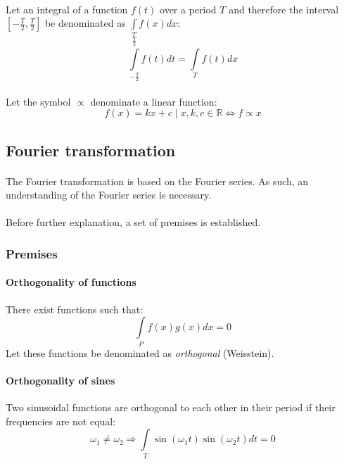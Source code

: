 \documentclass{article}
\begin{document}
\paragraph*{}
Let an integral of a function $f(t)$ over a period $T$ and therefore the
interval $[-\frac{T}{2}, \frac{T}{2}]$ be denominated as $\int\limits_{T} f(x) dx$:
$$\int\limits_{-\frac{T}{2}}^{\frac{T}{2}} f(t) dt = \int\limits_{T} f(t) dx$$

\paragraph*{}
Let the symbol $\propto$ denominate a linear function:
$$f(x) = k x + c \mid x, k, c \in \mathbb{R} \iff f \propto x$$

\subsection{Fourier transformation}

\paragraph*{}
The Fourier transformation is based on the Fourier series. As such, an
understanding of the Fourier series is necessary.

\paragraph*{}
Before further explanation, a set of premises is established.

\subsubsection{Premises}

\paragraph{Orthogonality of functions}
There exist functions such that:
$$\int\limits_P f(x) g(x) dx = 0$$
Let these functions be denominated as \textit{orthogonal} (Weisstein). 

\paragraph{Orthogonality of sines}
Two sinusoidal functions are orthogonal to each other in their period if their
frequencies are not equal:
$$\omega_1 \neq \omega_2 \Rightarrow \int\limits_T \sin (\omega_1 t) \sin(\omega_2 t)
dt = 0$$
\end{document}

